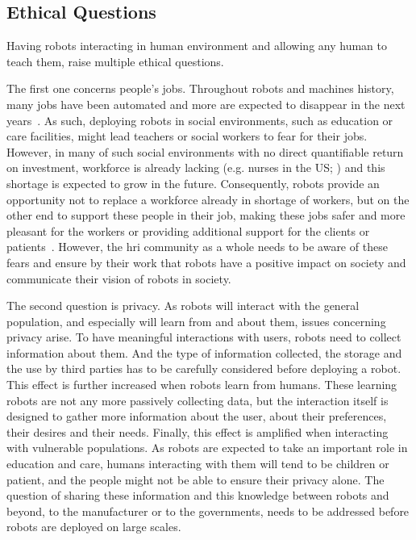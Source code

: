 \subsection{Ethical Questions} \label{sec:disc_ethics}
Having robots interacting in human environment and allowing any human to teach them, raise multiple ethical questions.

The first one concerns people's jobs. Throughout robots and machines history, many jobs have been automated and more are expected to disappear in the next years~\citep{frey2017future}. As such, deploying robots in social environments, such as education or care facilities, might lead teachers or social workers to fear for their jobs. However, in many of such social environments with no direct quantifiable return on investment, workforce is already lacking (e.g. nurses in the US; \citealt{nevidjon2001nursing}) and this shortage is expected to grow in the future. Consequently, robots provide an opportunity not to replace a workforce already in shortage of workers, but on the other end to support these people in their job, making these jobs safer and more pleasant for the workers or providing additional support for the clients or patients~\citep{wada2005psychological}. However, the \gls{hri} community as a whole needs to be aware of these fears and ensure by their work that robots have a positive impact on society and communicate their vision of robots in society.

The second question is privacy. As robots will interact with the general population, and especially will learn from and about them, issues concerning privacy arise. To have meaningful interactions with users, robots need to collect information about them. And the type of information collected, the storage and the use by third parties has to be carefully considered before deploying a robot. This effect is further increased when robots learn from humans. These learning robots are not any more passively collecting data, but the interaction itself is designed to gather more information about the user, about their preferences, their desires and their needs. Finally, this effect is amplified when interacting with vulnerable populations. As robots are expected to take an important role in education and care, humans interacting with them will tend to be children or patient, and the people might not be able to ensure their privacy alone. The question of sharing these information and this knowledge between robots and beyond, to the manufacturer or to the governments, needs to be addressed before robots are deployed on large scales.

